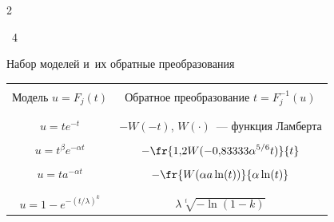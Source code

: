 \begin{multicols}{2}

\begin{center}

\noindent

\parbox{231pt}{{{\tablename~4}\ \ 

\small{Набор моделей и~их обратные преобразования}}

}



\vspace*{6pt}



{\small 

\tabcolsep=1pt

\begin{tabular}{|c|c|}

\hline

&\\[-9pt]

Модель $u=F_j(t)$ &Обратное преобразование $t=F_j^{-1}(u)$\\

&\\[-9pt]

\hline

&\\[-9pt]

$u=te^{-t}$&$-W(-t)$, $W(\cdot)$~--- функция Ламберта\\

\hline

&\\[-9pt]

$u=t^\beta e^{-\alpha t}$&$\displaystyle -\fr{1{,}2W(-0{,}83333\alpha^{5/6} t)}{t}$\\

\hline

&\\[-9pt]

$u=ta^{-\alpha t}$&$\displaystyle -\fr{W(\alpha a \ln(t))}{\alpha\ln(t)}$ \\

&\\[-9pt]

\hline

&\\[-9pt]

$u=1-e^{-(t/\lambda)^k}$&$\lambda \sqrt[t]{-\ln (1-k)}$ \\

\hline

\end{tabular}

}
\end{center}
\end{multicols}

